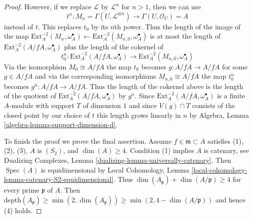 \documentclass{stacks-project}
\theoremstyle{plain}
\theoremstyle{definition}
\theoremstyle{remark}
\numberwithin{equation}{subsection}
\def\Spec{\mathop{\mathrm{Spec}}}
\begin{document}
\begin{proof}
\medskip\noindent
However, if we replace $\mathcal{L}$ by $\mathcal{L}^n$ for $n > 1$,
then we can use
$$
t^n :
M_n = \Gamma(U, \mathcal{L}^{\otimes n})
\longrightarrow
\Gamma(U, \mathcal{O}_U) = A
$$
instead of $t$. This replaces $t_0$ by its $n$th power.
Thus the length of the image of the map
$\text{Ext}^{-2}_A(M_n, \omega_A^\bullet) \leftarrow
\text{Ext}^{-2}_A(M_{n, 0}, \omega_A^\bullet)$
is at most the length of $\text{Ext}^{-2}_A(A/fA, \omega_A^\bullet)$
plus the length of the cokernel of
$$
t_0^n : 
\text{Ext}^{-2}_A(A/fA, \omega_A^\bullet)
\longrightarrow
\text{Ext}^{-2}_A(M_{n, 0}, \omega_A^\bullet)
$$
Via the isomorphism $M_0 \cong A/fA$ the map $t_0$ becomes
$g : A/fA \to A/fA$ for some $g \in A/fA$ and via the corresponding
isomorphisms $M_{n, 0} \cong A/fA$ the map $t_0^n$ becomes
$g^n : A/fA \to A/fA$. Thus the length of the cokernel above
is the length of the quotient of
$\text{Ext}^{-2}_A(A/fA, \omega_A^\bullet)$ by $g^n$.
Since $\text{Ext}^{-2}_A(A/fA, \omega_A^\bullet)$ is a finite $A$-module
with support $T$ of dimension $1$ and since $V(g) \cap T$
consists of the closed point by our choice of $t$
this length grows linearly in $n$ by
Algebra, Lemma \ref{algebra-lemma-support-dimension-d}.

\medskip\noindent
To finish the proof we prove the final assertion. Assume
$f \in \mathfrak m \subset A$ satisfies
(1), (2), (3), $A$ is $(S_2)$, and $\dim(A) \geq 4$.
Condition (1) implies $A$ is catenary, see
Dualizing Complexes, Lemma \ref{dualizing-lemma-universally-catenary}.
Then $\Spec(A)$ is equidimensional by Local Cohomology, Lemma
\ref{local-cohomology-lemma-catenary-S2-equidimensional}.
Thus $\dim(A_\mathfrak p) + \dim(A/\mathfrak p) \geq 4$
for every prime $\mathfrak p$ of $A$. Then
$\text{depth}(A_\mathfrak p) \geq \min(2, \dim(A_\mathfrak p))
\geq \min(2, 4 - \dim(A/\mathfrak p))$ and hence (4) holds.
\end{proof}
\end{document}
